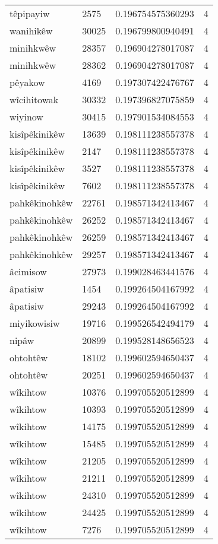 \begin{longtable}{llll}
têpipayiw & 2575 & 0.196754575360293 & 4 \\
wanihikêw & 30025 & 0.196799800940491 & 4 \\
minihkwêw & 28357 & 0.196904278017087 & 4 \\
minihkwêw & 28362 & 0.196904278017087 & 4 \\
pêyakow & 4169 & 0.197307422476767 & 4 \\
wîcihitowak & 30332 & 0.197396827075859 & 4 \\
wiyinow & 30415 & 0.197901534084553 & 4 \\
kisîpêkinikêw & 13639 & 0.198111238557378 & 4 \\
kisîpêkinikêw & 2147 & 0.198111238557378 & 4 \\
kisîpêkinikêw & 3527 & 0.198111238557378 & 4 \\
kisîpêkinikêw & 7602 & 0.198111238557378 & 4 \\
pahkêkinohkêw & 22761 & 0.198571342413467 & 4 \\
pahkêkinohkêw & 26252 & 0.198571342413467 & 4 \\
pahkêkinohkêw & 26259 & 0.198571342413467 & 4 \\
pahkêkinohkêw & 29257 & 0.198571342413467 & 4 \\
âcimisow & 27973 & 0.199028463441576 & 4 \\
âpatisiw & 1454 & 0.199264504167992 & 4 \\
âpatisiw & 29243 & 0.199264504167992 & 4 \\
miyikowisiw & 19716 & 0.199526542494179 & 4 \\
nipâw & 20899 & 0.199528148656523 & 4 \\
ohtohtêw & 18102 & 0.199602594650437 & 4 \\
ohtohtêw & 20251 & 0.199602594650437 & 4 \\
wîkihtow & 10376 & 0.199705520512899 & 4 \\
wîkihtow & 10393 & 0.199705520512899 & 4 \\
wîkihtow & 14175 & 0.199705520512899 & 4 \\
wîkihtow & 15485 & 0.199705520512899 & 4 \\
wîkihtow & 21205 & 0.199705520512899 & 4 \\
wîkihtow & 21211 & 0.199705520512899 & 4 \\
wîkihtow & 24310 & 0.199705520512899 & 4 \\
wîkihtow & 24425 & 0.199705520512899 & 4 \\
wîkihtow & 7276 & 0.199705520512899 & 4 \\

\end{longtable}
